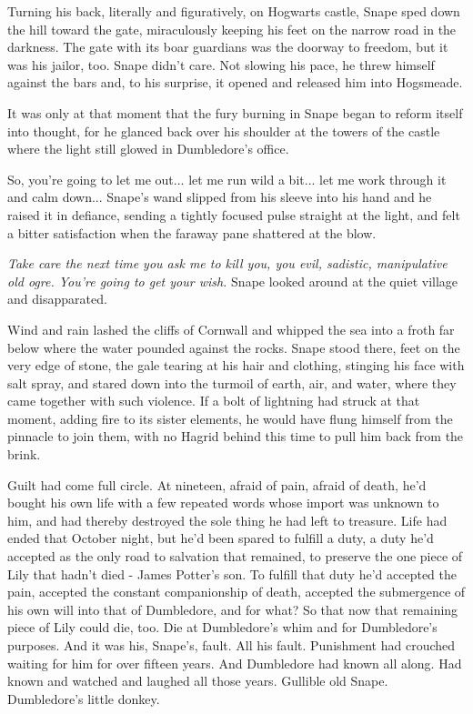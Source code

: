 \documentclass[a4paper,11pt]{article}
\begin{document}
Turning his back, literally and figuratively, on Hogwarts castle, Snape sped down the hill toward the gate, miraculously keeping his feet on the narrow road in the darkness. The gate with its boar guardians was the doorway to freedom, but it was his jailor, too. Snape didn't care. Not slowing his pace, he threw himself against the bars and, to his surprise, it opened and released him into Hogsmeade.

It was only at that moment that the fury burning in Snape began to reform itself into thought, for he glanced back over his shoulder at the towers of the castle where the light still glowed in Dumbledore's office.

So, you're going to let me out... let me run wild a bit... let me work through it and calm down... Snape's wand slipped from his sleeve into his hand and he raised it in defiance, sending a tightly focused pulse straight at the light, and felt a bitter satisfaction when the faraway pane shattered at the blow.

\emph{Take care the next time you ask me to kill you, you evil, sadistic, manipulative old ogre. You're going to get your wish.} Snape looked around at the quiet village and disapparated.

Wind and rain lashed the cliffs of Cornwall and whipped the sea into a froth far below where the water pounded against the rocks. Snape stood there, feet on the very edge of stone, the gale tearing at his hair and clothing, stinging his face with salt spray, and stared down into the turmoil of earth, air, and water, where they came together with such violence. If a bolt of lightning had struck at that moment, adding fire to its sister elements, he would have flung himself from the pinnacle to join them, with no Hagrid behind this time to pull him back from the brink.

Guilt had come full circle. At nineteen, afraid of pain, afraid of death, he'd bought his own life with a few repeated words whose import was unknown to him, and had thereby destroyed the sole thing he had left to treasure. Life had ended that October night, but he'd been spared to fulfill a duty, a duty he'd accepted as the only road to salvation that remained, to preserve the one piece of Lily that hadn't died - James Potter's son. To fulfill that duty he'd accepted the pain, accepted the constant companionship of death, accepted the submergence of his own will into that of Dumbledore, and for what? So that now that remaining piece of Lily could die, too. Die at Dumbledore's whim and for Dumbledore's purposes. And it was his, Snape's, fault. All his fault. Punishment had crouched waiting for him for over fifteen years. And Dumbledore had known all along. Had known and watched and laughed all those years. Gullible old Snape. Dumbledore's little donkey.
\end{document}
